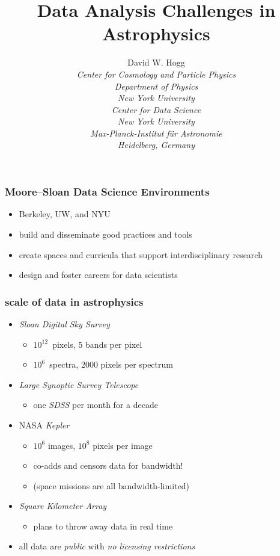 \documentclass[pdftex]{beamer}
\title{Data Analysis Challenges in Astrophysics}
\author[David W. Hogg (NYU)]{David W. Hogg \\[1ex]
  \textsl{\small Center for Cosmology and Particle Physics\\
                 Department of Physics\\
                 New York University\\[2ex]
                 Center for Data Science\\
                 New York University\\[2ex]
                 Max-Planck-Institut f\"ur Astronomie\\
                 Heidelberg, Germany}}
\begin{document}
\begin{frame}
  \titlepage
\end{frame}

\begin{frame}
  \frametitle{Moore--Sloan Data Science Environments}
  \begin{itemize}
  \item Berkeley, UW, and NYU
  \item build and disseminate good practices and tools
  \item create spaces and curricula that support interdisciplinary research
  \item design and foster careers for data scientists
  \end{itemize}
\end{frame}

\begin{frame}
  \frametitle{scale of data in astrophysics}
  \begin{itemize}
  \item \textsl{Sloan Digital Sky Survey}
    \begin{itemize}
    \item $10^{12}$~pixels, 5 bands per pixel
    \item $10^6$~spectra, 2000 pixels per spectrum
    \end{itemize}
  \item \textsl{Large Synoptic Survey Telescope}
    \begin{itemize}
    \item one \textsl{SDSS} per month for a decade
    \end{itemize}
  \item NASA \textsl{Kepler}
    \begin{itemize}
    \item $10^6$ images, $10^8$ pixels per image
    \item co-adds and censors data for bandwidth!
    \item (space missions are all bandwidth-limited)
    \end{itemize}
  \item \textsl{Square Kilometer Array}
    \begin{itemize}
    \item plans to throw away data in real time
    \end{itemize}
  \item all data are \emph{public} with \emph{no licensing restrictions}
  \end{itemize}
\end{frame}
\end{document}
